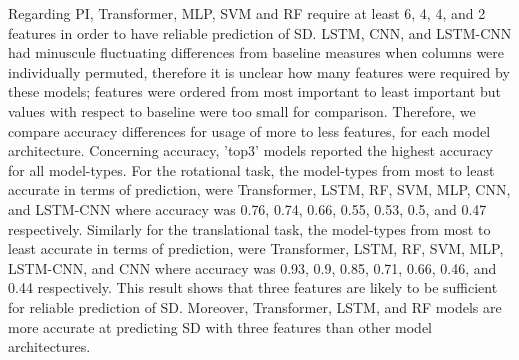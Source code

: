 \documentclass{ieeeaccess}
\begin{document}
Regarding PI, Transformer, MLP, SVM and RF require at least 6, 4, 4, and 2 features in order to have reliable prediction of SD. LSTM, CNN, and LSTM-CNN had minuscule fluctuating differences from baseline measures when columns were individually permuted, therefore it is unclear how many features were required by these models; features were ordered from most important to least important but values with respect to baseline were too small for comparison. Therefore, we compare accuracy differences for usage of more to less features, for each model architecture. Concerning accuracy, 'top3' models reported the highest accuracy for all model-types. For the rotational task, the model-types from most to least accurate in terms of prediction, were Transformer, LSTM, RF, SVM, MLP, CNN, and LSTM-CNN where accuracy was 0.76, 0.74, 0.66, 0.55, 0.53, 0.5, and 0.47 respectively. Similarly for the translational task, the model-types from most to least accurate in terms of prediction, were Transformer, LSTM, RF, SVM, MLP, LSTM-CNN, and CNN where accuracy was 0.93, 0.9, 0.85, 0.71, 0.66, 0.46, and 0.44 respectively. This result shows that three features are likely to be sufficient for reliable prediction of SD. Moreover, Transformer, LSTM, and RF models are more accurate at predicting SD with three features than other model architectures.
\end{document}
